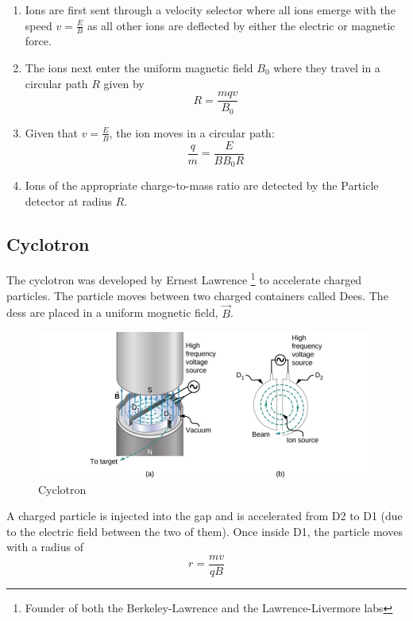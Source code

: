 \documentclass[14pt]{memoir}
\begin{document}
\begin{enumerate}
\item Ions are first sent through a velocity selector where all ions emerge with the speed $v = \frac{E}{B}$ as all other ions are deflected by either the electric or magnetic force.
\item The ions next enter the uniform magnetic field $B_0$ where they travel in a circular path $R$ given by
\begin{equation}
R = \frac{m q v}{B_0}
\end{equation}
\item Given that $v = \frac{E}{B}$, the ion moves in a circular path:
\begin{equation}
\frac{q}{m} = \frac{E}{B B_0 R}
\end{equation}
\item Ions of the appropriate charge-to-mass ratio are detected by the Particle detector at radius $R$. 
\end{enumerate}

\subsection{Cyclotron}

The cyclotron was developed by Ernest Lawrence \footnote{Founder of both the Berkeley-Lawrence and the Lawrence-Livermore labs} to accelerate charged particles. The particle moves between two charged containers called Dees. The dess are placed in a uniform mognetic field, $\vec{B}$. 

\begin{figure}[H]
\begin{center}
\includegraphics[scale=0.50]{fig/fig_11_20.jpg}
\caption{Cyclotron}
\label{fig:11_20}
\end{center}
\end{figure}

A charged particle is injected into the gap and is accelerated from D2 to D1 (due to the electric field between the two of them). Once inside D1, the particle moves with a radius of 
\begin{equation}
r = \frac{mv}{qB}
\end{equation}
\end{document}
